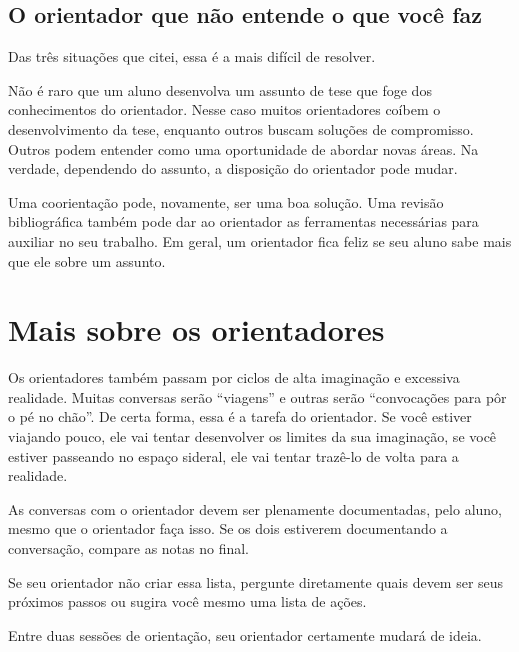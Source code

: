 

\subsection{O orientador que não entende o que você faz}


Das três situações que citei, essa é a mais difícil de resolver.


Não é raro que um aluno desenvolva um assunto de tese que foge dos conhecimentos do orientador. Nesse caso muitos orientadores coíbem o desenvolvimento da tese, enquanto outros buscam soluções de compromisso. Outros podem entender como uma oportunidade de abordar novas áreas. Na verdade, dependendo do assunto, a disposição do orientador pode mudar.


Uma coorientação pode, novamente, ser uma boa solução. Uma revisão bibliográfica também pode dar ao orientador as ferramentas necessárias para auxiliar no seu trabalho. Em geral, um orientador fica feliz se seu aluno sabe mais que ele sobre um assunto.


\section{Mais sobre os orientadores}


Os orientadores também passam por ciclos de alta imaginação e excessiva realidade. Muitas conversas serão “viagens” e outras serão “convocações para pôr o pé no chão”. De certa forma, essa é a tarefa do orientador. Se você estiver viajando pouco, ele vai tentar desenvolver os limites da sua imaginação, se você estiver passeando no espaço sideral, ele vai tentar trazê-lo de volta para a realidade.


As conversas com o orientador devem ser plenamente documentadas, pelo aluno, mesmo que o orientador faça isso. Se os dois estiverem documentando a conversação, compare as notas no final. 




Se seu orientador não criar essa lista, pergunte diretamente quais devem ser seus próximos passos ou sugira você mesmo uma lista de ações. 


Entre duas sessões de orientação, seu orientador certamente mudará de ideia. 




